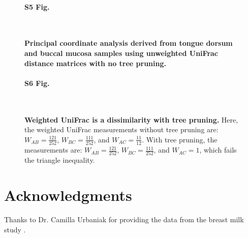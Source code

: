 \documentclass[10pt,letterpaper]{article}
\begin{document}
\begin{figure}[h]
\paragraph*{S5 Fig.}\mbox{}\\
\caption[Principal coordinate analysis derived from tongue dorsum and buccal mucosa samples using unweighted UniFrac distance matrices with no tree pruning.]{{\bf Principal coordinate analysis derived from tongue dorsum and buccal mucosa samples using unweighted UniFrac distance matrices with no tree pruning.}}
\label{S3_Fig}
\end{figure}

\begin{figure}[h]
\paragraph*{S6 Fig.}\mbox{}\\
\caption[Weighted UniFrac is a dissimilarity with tree pruning.]{{\bf Weighted UniFrac is a dissimilarity with tree pruning.} Here, the weighted UniFrac measurements without tree pruning are: $W_{AB} = \frac{121}{252}$, $W_{BC} = \frac{111}{252}$, and $W_{AC} = \frac{11}{12}$. With tree pruning, the measurements are: $W_{AB} = \frac{121}{252}$, $W_{BC} = \frac{111}{252}$, and $W_{AC} = 1$, which fails the triangle inequality.}
\label{S4_Fig}
\end{figure}

\section*{Acknowledgments}
Thanks to Dr. Camilla Urbaniak for providing the data from the breast milk study \cite{urbaniak2016human}.

\nolinenumbers

%
%
% 

\end{document}
